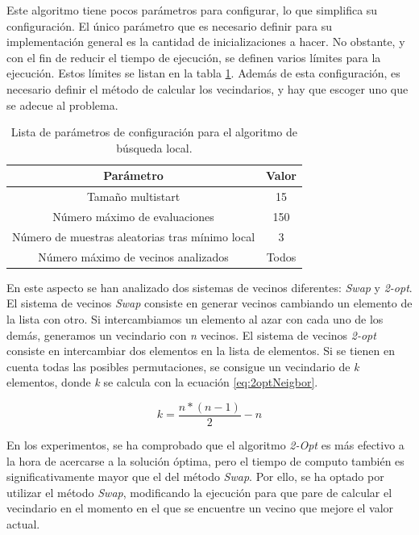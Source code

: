 \documentclass[10pt,a4paper]{article}
\begin{document}
Este algoritmo tiene pocos parámetros para configurar, lo que simplifica su configuración. El único parámetro que es necesario definir para su implementación general es la cantidad de inicializaciones a hacer. No obstante, y con el fin de reducir el tiempo de ejecución, se definen varios límites para la ejecución. Estos límites se listan en la tabla \ref{tab:lsParameters}. Además de esta configuración, es necesario definir el método de calcular los vecindarios, y hay que escoger uno que se adecue al problema. 

\begin{table}
\begin{center}
\begin{tabular}{|c||c|}
\hline
Parámetro & Valor \\
\hline \hline
Tamaño multistart & 15 \\
\hline
Número máximo de evaluaciones & 150 \\
\hline
Número de muestras aleatorias tras mínimo local & 3\\
\hline
Número máximo de vecinos analizados & Todos\\
\hline
\end{tabular}
\end{center}
\caption{Lista de parámetros de configuración para el algoritmo de búsqueda local.}
\label{tab:lsParameters}
\end{table}

En este aspecto se han analizado dos sistemas de vecinos diferentes: \textit{Swap} y \textit{2-opt}.
El sistema de vecinos \textit{Swap} consiste en generar vecinos cambiando un elemento de la lista con otro. Si intercambiamos un elemento al azar con cada uno de los demás, generamos un vecindario con \textit{n} vecinos.
El sistema de vecinos \textit{2-opt} consiste en intercambiar dos elementos en la lista de elementos. Si se tienen en cuenta todas las posibles permutaciones, se consigue un vecindario de \textit{k} elementos, donde \textit{k} se calcula con la ecuación \ref{eq:2optNeigbor}.

\begin{equation}
\label{eq:2optNeigbor}
k = \frac{n*(n-1)}{2}-n
\end{equation}

En los experimentos, se ha comprobado que el algoritmo \textit{2-Opt} es más efectivo a la hora de acercarse a la solución óptima, pero el tiempo de computo también es significativamente mayor que el del método \textit{Swap}. Por ello, se ha optado por utilizar el método \textit{Swap}, modificando la ejecución para que pare de calcular el vecindario en el momento en el que se encuentre un vecino que mejore el valor actual.
\end{document}
